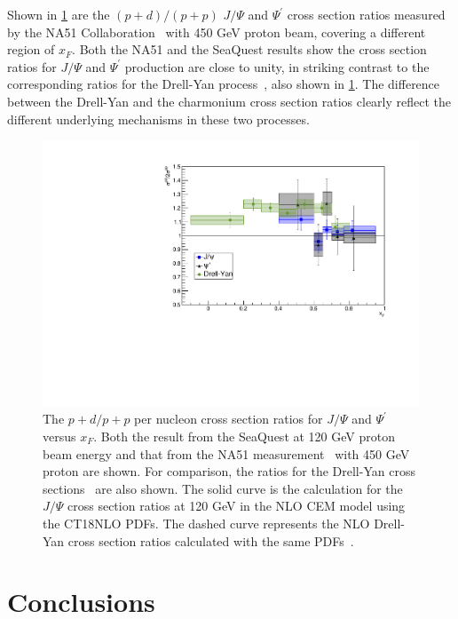 \documentclass[reprint,aps,unsortedaddress,superscriptaddress,prd,floatfix,showpacs,linenumbers]{revtex4-2}
\begin{document}
Shown in \cref{fig:pd/pp_csr} are the $(p+d)/(p+p)$ $J/\Psi$
and $\Psi^\prime$ cross section
ratios measured by the NA51 Collaboration~\cite{abreu1998} with 450 GeV proton
beam, covering a different region of $x_F$. Both the NA51 and the SeaQuest
results show the cross section ratios for $J/\Psi$ and $\Psi^\prime$
production are close to unity, in striking contrast to
the corresponding ratios for the Drell-Yan process~\cite{dove2023}, also
shown in \cref{fig:pd/pp_csr}. The difference between the Drell-Yan and the charmonium
cross section ratios clearly reflect the different underlying mechanisms in
these two processes.
\begin{figure}
	\includegraphics[width=\linewidth]{crossSections/xF/pdpp_CSR_5-6.pdf}
	\caption{The $p+d/p+p$ per nucleon cross section ratios for $J/\Psi$ and
		$\Psi^\prime$ versus $x_F$. Both the result from the SeaQuest at 120 GeV proton
		beam energy and that from the NA51 measurement~\cite{abreu1998} with 450
		GeV proton are shown.
		For comparison, the ratios for the Drell-Yan cross sections~\cite{dove2023} are
		also shown. The solid curve is the calculation for the $J/\Psi$ cross section
		ratios at 120 GeV in the NLO CEM model using the CT18NLO PDFs. The dashed
		curve represents the NLO Drell-Yan cross section ratios calculated with the
		same PDFs~\cite{dove2023}.}
	\label{fig:pd/pp_csr}
\end{figure}

\section{Conclusions}
\label{sec:Conclusions}

\begin{acknowledgments}
\end{acknowledgments}

\nocite{*}

\end{document}
